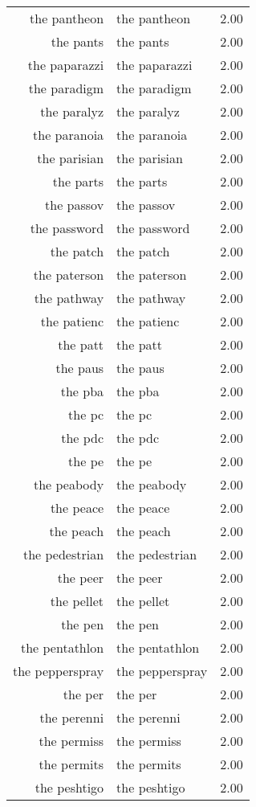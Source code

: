 \begin{table}[ht]
\begin{tabular}{rlr}
  the pantheon & the pantheon & 2.00 \\ 
  the pants & the pants & 2.00 \\ 
  the paparazzi & the paparazzi & 2.00 \\ 
  the paradigm & the paradigm & 2.00 \\ 
  the paralyz & the paralyz & 2.00 \\ 
  the paranoia & the paranoia & 2.00 \\ 
  the parisian & the parisian & 2.00 \\ 
  the parts & the parts & 2.00 \\ 
  the passov & the passov & 2.00 \\ 
  the password & the password & 2.00 \\ 
  the patch & the patch & 2.00 \\ 
  the paterson & the paterson & 2.00 \\ 
  the pathway & the pathway & 2.00 \\ 
  the patienc & the patienc & 2.00 \\ 
  the patt & the patt & 2.00 \\ 
  the paus & the paus & 2.00 \\ 
  the pba & the pba & 2.00 \\ 
  the pc & the pc & 2.00 \\ 
  the pdc & the pdc & 2.00 \\ 
  the pe & the pe & 2.00 \\ 
  the peabody & the peabody & 2.00 \\ 
  the peace & the peace & 2.00 \\ 
  the peach & the peach & 2.00 \\ 
  the pedestrian & the pedestrian & 2.00 \\ 
  the peer & the peer & 2.00 \\ 
  the pellet & the pellet & 2.00 \\ 
  the pen & the pen & 2.00 \\ 
  the pentathlon & the pentathlon & 2.00 \\ 
  the pepperspray & the pepperspray & 2.00 \\ 
  the per & the per & 2.00 \\ 
  the perenni & the perenni & 2.00 \\ 
  the permiss & the permiss & 2.00 \\ 
  the permits & the permits & 2.00 \\ 
  the peshtigo & the peshtigo & 2.00 \\ 

\end{tabular}
\end{table}
